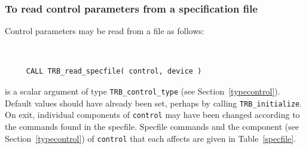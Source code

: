 \documentclass{galahad}
\newcommand{\packagename}{TRB}
\begin{document}
\subsubsection{To read control parameters from a specification file}
\label{readspec}

Control parameters may be read from a file as follows:
\hskip0.5in
\def\baselinestretch{0.8} {\tt
\begin{verbatim}
     CALL TRB_read_specfile( control, device )
\end{verbatim}
}
\def\baselinestretch{1.0}

\begin{description}
 is a scalar \intentinout argument of type
{\tt \packagename\_control\_type}
(see Section~\ref{typecontrol}).
Default values should have already been set, perhaps by calling
{\tt \packagename\_initialize}.
On exit, individual components of {\tt control} may have been changed
according to the commands found in the specfile. Specfile commands and
the component (see Section~\ref{typecontrol}) of {\tt control}
that each affects are given in Table~\vref{specfile}.


\end{description}
\end{document}
